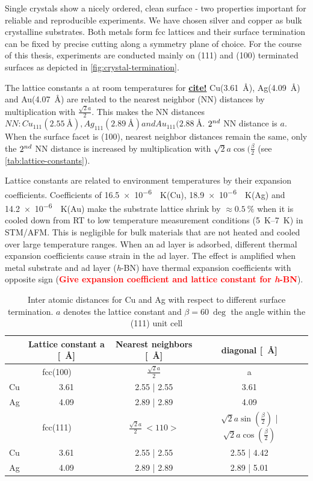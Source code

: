 Single crystals show a nicely ordered, clean surface - two properties important for reliable and reproducible experiments. We have chosen silver and copper as bulk crystalline substrates. Both metals form fcc lattices and their surface termination can be fixed by precise cutting along a symmetry plane of choice. For the course of this thesis, experiments are conducted mainly on (111) and (100) terminated surfaces as depicted in \autoref{fig:crystal-termination}.

The lattice constants a at room temperatures for \underline{\textbf{cite!}} Cu(\SI{3,61}{\angstrom}), Ag(\SI{4,09}{\angstrom}) and Au(\SI{4,07}{\angstrom}) are related to the nearest neighbor (NN) distances by multiplication with $\frac{\sqrt{2}a}{2}$. This makes the NN distances $NN: Cu_{111}(\SI{2,55}{\angstrom}), Ag_{111}(\SI{2,89}{\angstrom}) and Au_{111}(\SI{2,88}{\angstrom}$. $\textnormal{2}^{nd}$ NN distance is $a$. When the surface facet is (100), nearest neighbor distances remain the same, only the $\textnormal{2}^{nd}$ NN distance is increased by multiplication with $\sqrt{2}a\cos(\frac{\beta}{2}$ (see \autoref{tab:lattice-constants}).

Lattice constants are related to environment temperatures by their expansion coefficients.
Coefficients of \SI{16,5e-6}{\per \kelvin}(Cu), \SI{18,9e-6}{\per \kelvin}(Ag) and \SI{14,2e-6}{\per \kelvin}(Au) make the substrate lattice shrink by $\approx \SI{0,5}{\percent}$ when it is cooled down from RT to low temperature measurement conditions (\SIrange{5}{7}{\kelvin}) in STM/AFM. This is negligible for bulk materials that are not heated and cooled over large temperature ranges. When an ad layer is adsorbed, different thermal expansion coefficients cause strain in the ad layer. The effect is amplified when metal substrate and ad layer (\textit{h}-BN)
have thermal expansion coefficients with opposite sign (\textcolor{red}{\textbf{Give expansion coefficient and lattice constant for \textit{h}-BN}}).\cite{farwick_zum_hagen_structure_2016}

\begin{table}
\centering {}
\caption{Inter atomic distances for Cu and Ag with respect to different surface termination. $a$ denotes the lattice constant and $\beta= \SI{60}{\deg}$ the angle within the (111) unit cell}
\label{tab:lattice-constants}
  \begin{tabular}{ccccc}
& Lattice constant a [\SI{}{\angstrom}] & Nearest neighbors [\SI{}{\angstrom}] & diagonal [\SI{}{\angstrom}]\\ \hline 
\multicolumn{2}{c}{fcc(100)} & $\frac{\sqrt{2}a}{2}$ & a \\
  Cu	 	& 3.61	& 2.55 | 2.55 & 3.61  \\
  Ag		& 4.09	& 2.89 | 2.89 & 4.09 \\ \hline 
\multicolumn{2}{c}{fcc(111)} & $\frac{\sqrt{2}a}{2} \ <110>$ & $\sqrt{2}a\sin(\frac{\beta}{2})$ | $\sqrt{2}a\cos(\frac{\beta}{2})$\\
Cu 		& 3.61	& 2.55 | 2.55	& 2.55 | 4.42 \\
Ag		& 4.09	& 2.89 | 2.89	& 2.89 | 5.01 \\ \hline
 \end{tabular}
\end{table}

